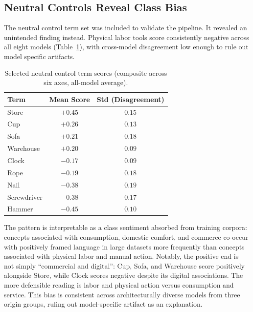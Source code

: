 \documentclass[11pt, letterpaper]{article}
\begin{document}
\subsection{Neutral Controls Reveal Class Bias}

The neutral control term set was included to validate the pipeline. It revealed an unintended finding instead. Physical labor tools score consistently negative across all eight models (Table~\ref{tab:neutral_controls}), with cross-model disagreement low enough to rule out model specific artifacts.

\begin{table}[H]
  \centering
  \begin{tabular}{lcc}
    \toprule
    \textbf{Term} & \textbf{Mean Score} & \textbf{Std (Disagreement)} \\
    \midrule
    Store       & $+0.45$ & $0.15$ \\
    Cup         & $+0.26$ & $0.13$ \\
    Sofa        & $+0.21$ & $0.18$ \\
    Warehouse   & $+0.20$ & $0.09$ \\
    Clock       & $-0.17$ & $0.09$ \\
    Rope        & $-0.19$ & $0.18$ \\
    Nail        & $-0.38$ & $0.19$ \\
    Screwdriver & $-0.38$ & $0.17$ \\
    Hammer      & $-0.45$ & $0.10$ \\
    \bottomrule
  \end{tabular}
  \caption{Selected neutral control term scores (composite across six axes,
  all-model average).}
  \label{tab:neutral_controls}
\end{table}

The pattern is interpretable as a class sentiment absorbed from training corpora: concepts associated with consumption, domestic comfort, and commerce co-occur with positively framed language in large datasets more frequently than concepts associated with physical labor and manual action. Notably, the positive end is not simply ``commercial and digital'': Cup, Sofa, and Warehouse score positively alongside Store, while Clock scores negative despite its digital associations. The more defensible reading is labor and physical action versus consumption and service. This bias is consistent across architecturally diverse models from three origin groups, ruling out model-specific artifact as an explanation.
\end{document}
